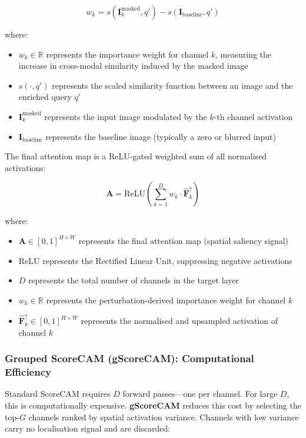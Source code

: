 \[
w_k = s\!\left(\mathbf{I}_k^{\text{masked}}, q'\right) - s\!\left(\mathbf{I}_{\text{baseline}}, q'\right)
\]

where:
\begin{itemize}
\item $w_k \in \mathbb{R}$ represents the importance weight for channel $k$, measuring the increase in cross-modal similarity induced by the masked image
\item $s(\cdot, q')$ represents the scaled similarity function between an image and the enriched query $q'$
\item $\mathbf{I}_k^{\text{masked}}$ represents the input image modulated by the $k$-th channel activation
\item $\mathbf{I}_{\text{baseline}}$ represents the baseline image (typically a zero or blurred input)
\end{itemize}

The final attention map is a ReLU-gated weighted sum of all normalised activations:

\[
\mathbf{A} = \text{ReLU}\!\left(\sum_{k=1}^{D} w_k \cdot \hat{\mathbf{F}}_k^{\uparrow}\right)
\]

where:
\begin{itemize}
\item $\mathbf{A} \in [0,1]^{H \times W}$ represents the final attention map (spatial saliency signal)
\item $\text{ReLU}$ represents the Rectified Linear Unit, suppressing negative activations
\item $D$ represents the total number of channels in the target layer
\item $w_k \in \mathbb{R}$ represents the perturbation-derived importance weight for channel $k$
\item $\hat{\mathbf{F}}_k^{\uparrow} \in [0,1]^{H \times W}$ represents the normalised and upsampled activation of channel $k$
\end{itemize}

\subsubsection{Grouped ScoreCAM (gScoreCAM): Computational Efficiency}

Standard ScoreCAM requires $D$ forward passes---one per channel. For large $D$, this is computationally expensive. \textbf{gScoreCAM} reduces this cost by selecting the top-$G$ channels ranked by spatial activation variance. Channels with low variance carry no localisation signal and are discarded:


